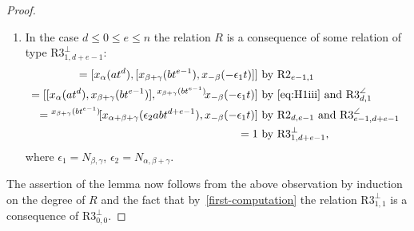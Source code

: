 \documentclass[oneside, 8pt]{amsart}
\theoremstyle{remark}
\theoremstyle{definition}
\numberwithin{lemma}{section}
\numberwithin{prop}{section}
\numberwithin{corollary}{section}
\numberwithin{externaltheorem}{section}
\numberwithin{equation}{section}
\begin{document}
\begin{proof}
\begin{enumerate}
\item In the case $d \leq 0 \leq e \leq n$ the relation $R$ is a consequence of some relation of type $\text{R3}^\bot_{1,d+e-1}$:
\begin{align*} [x_\alpha(at^d), x_{\gamma}(bt^{e})] = [x_\alpha(at^d), [x_{\beta+\gamma}(b t^{e-1}), x_{-\beta}(-\epsilon_1 t)]] & \text{ by~$\text{R2}_{e-1,1}$ } \\
 = [[x_\alpha(at^d), x_{\beta+\gamma}(bt^{e-1})], {}^{x_{\beta+\gamma}(bt^{e-1})}\!x_{-\beta}(-\epsilon_1 t)] & \text{ by \eqref{eq:H1iii} and $\text{R3}^\angle_{d,1}$ } \\
 = {}^{x_{\beta+\gamma}(bt^{e-1})}\![x_{\alpha+\beta+\gamma}(\epsilon_2abt^{d+e-1}), x_{-\beta}(-\epsilon_1 t)] & \text{ by $\text{R2}_{d,e-1}$ and $\text{R3}^\angle_{e-1,d+e-1}$  } \\
 = 1 & \text{ by $\text{R3}^\bot_{1,d+e-1}$,} \end{align*} where $\epsilon_1 = N_{\beta,\gamma}$, $\epsilon_2 = N_{\alpha,\beta+\gamma}$.
 \end{enumerate}                                                           

The assertion of the lemma now follows from the above observation by induction on the degree of $R$ and the fact that by~\eqref{first-computation} the relation $\text{R3}^\bot_{1,1}$ is a consequence of $\text{R3}^\bot_{0,0}$.
\end{proof}
\end{document}
